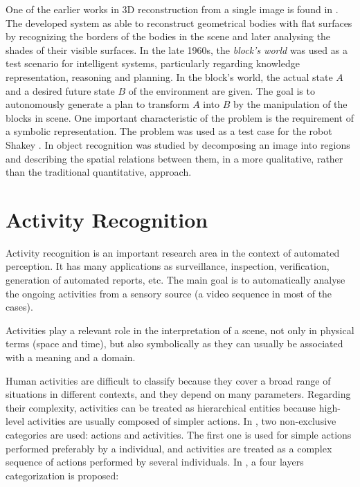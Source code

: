 \documentclass[a4paper, 12pt, openany, oneside]{book}
\begin{document}
One of the earlier works in 3D reconstruction from a single image is found in \citep{Roberts1963_PhDThesis}.
The developed system as able to reconstruct geometrical bodies with flat surfaces by recognizing the borders of the bodies in the scene and later analysing the shades of their visible surfaces.
In the late 1960s, the \textit{block's world} was used as a test scenario for intelligent systems, particularly regarding knowledge representation, reasoning and planning.
In the block's world, the actual state $A$ and a desired future state $B$ of the environment are given.
The goal is to autonomously generate a plan to transform $A$ into $B$ by the manipulation of the blocks in scene.
One important characteristic of the problem is the requirement of a symbolic representation.
The problem was used as a test case for the robot Shakey \citep{Nilsson84_Shakey}.
In \citep{Barrow1971_RelatDesc} object recognition was studied by decomposing an image into regions and describing the spatial relations between them, in a more qualitative, rather than the traditional quantitative, approach.




\section{Activity Recognition} %

Activity recognition is an important research area in the context of automated perception. 
It has many applications as surveillance, inspection, verification, generation of automated reports, etc.
The main goal is to automatically analyse the ongoing activities from a sensory source (a video sequence in most of the cases).

Activities play a relevant role in the interpretation of a scene, not only in physical terms (space and time), but also symbolically as they can usually be associated with a meaning and a domain. 

Human activities are difficult to classify because they cover a broad range of situations in different contexts, and they depend on many parameters.
Regarding their complexity, activities can be treated as hierarchical entities because high-level activities are usually composed of simpler actions.
In \citep{Turaga2008_MaRecHuAcSurv}, two non-exclusive categories are used: actions and activities.
The first one is used for simple actions performed preferably by a individual, and activities are treated as a complex sequence of actions performed by several individuals. In \citep{Aggarwal11_HumanActivity}, a four layers categorization is proposed:
\end{document}
